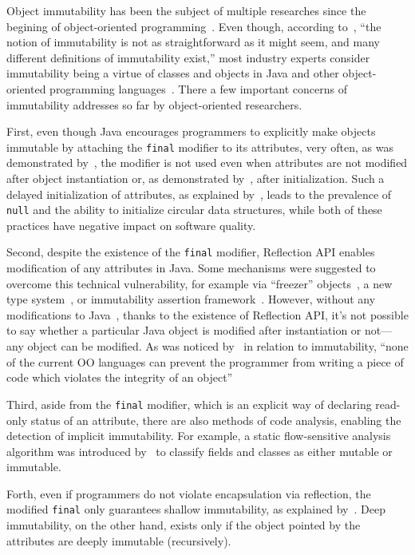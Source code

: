 \documentclass[12pt]{article}
\begin{document}
Object immutability has been the subject of multiple researches since
the begining of object-oriented programming~\citep{hakonen1999,porat2000,lea2000,taivalsaari1993}.
Even though, according to~\citet{potanin2013},
``the notion of immutability is not as straightforward as it might seem, and many
different definitions of immutability exist,'' most industry experts consider
immutability being a virtue of classes and objects in Java and other
object-oriented programming languages~\citep{bloch2016}. There a few important
concerns of immutability addresses so far by object-oriented researchers.

First, even though Java encourages programmers to explicitly make objects immutable
by attaching the \texttt{final} modifier to its attributes, very often, as was
demonstrated by~\citet{unkel2008}, the modifier is not used even when
attributes are not modified after object instantiation or, as demonstrated
by~\citet{nelson2012}, after initialization. Such a delayed initialization of attributes, as
explained by~\citet{fahndrich2007}, leads to the prevalence of \texttt{null}
and the ability to initialize circular data structures, while both of these
practices have negative impact on software quality.

Second, despite the existence of the \texttt{final} modifier, Reflection API enables
modification of any attributes in Java. Some mechanisms were suggested to
overcome this technical vulnerability, for example
via ``freezer'' objects~\citep{leino2008},
a new type system~\citep{tschantz2005},
or immutability assertion framework~\citep{pechtchanski2005}.
However, without any modifications to Java~\citep{steele2005},
thanks to the existence of Reflection API,
it's not possible to say whether a particular Java object is modified
after instantiation or not---any object can be modified. As was noticed
by~\citet{hakonen1999} in relation to immutability,
``none of the current OO languages can prevent the programmer from writing
a piece of code which violates the integrity of an object''

Third, aside from the \texttt{final} modifier, which is an explicit way of declaring
read-only status of an attribute, there are also methods of
code analysis, enabling the detection of implicit immutability. For example,
a static flow-sensitive analysis algorithm was introduced by~\citet{porat2000}
to classify fields and classes as either mutable or immutable.

Forth, even if programmers do not violate encapsulation via reflection, the
modified \texttt{final} only guarantees shallow immutability, as
explained by~\citet{hakonen1999}. Deep immutability, on the other hand,
exists only if the object pointed by the attributes are deeply immutable
(recursively).
\end{document}
